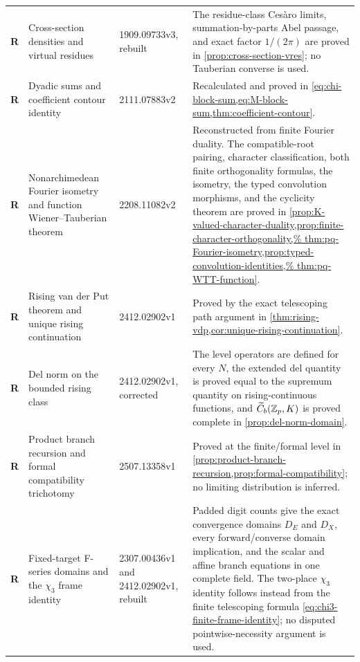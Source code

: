 \begin{longtable}{@{}p{}p{}p{}p{}@{}}
\textbf{R} & Cross-section densities and virtual residues & 1909.09733v3,
rebuilt & The residue-class Ces\`aro limits, summation-by-parts Abel passage,
and exact factor $1/(2\pi)$ are proved in
\cref{prop:cross-section-vres}; no Tauberian converse is used.\\

\textbf{R} & Dyadic sums and coefficient contour identity &
2111.07883v2 & Recalculated and proved in
\cref{eq:chi-block-sum,eq:M-block-sum,thm:coefficient-contour}.\\

\textbf{R} & Nonarchimedean Fourier isometry and function
Wiener--Tauberian theorem & 2208.11082v2 & Reconstructed from finite Fourier
duality.  The compatible-root pairing, character classification, both finite
orthogonality formulas, the isometry, the typed convolution morphisms, and
the cyclicity theorem are proved in
\cref{prop:K-valued-character-duality,prop:finite-character-orthogonality,%
thm:pq-Fourier-isometry,prop:typed-convolution-identities,%
thm:pq-WTT-function}.\\

\textbf{R} & Rising van der Put theorem and unique rising continuation &
2412.02902v1 & Proved by the exact telescoping path argument in
\cref{thm:rising-vdp,cor:unique-rising-continuation}.\\

\textbf{R} & Del norm on the bounded rising class & 2412.02902v1, corrected &
The level operators are defined for every $N$, the extended del quantity is
proved equal to the supremum quantity on rising-continuous functions, and
$\widetilde C_b(\mathbb Z_p,K)$ is proved complete in
\cref{prop:del-norm-domain}.\\

\textbf{R} & Product branch recursion and formal compatibility trichotomy &
2507.13358v1 & Proved at the finite/formal level in
\cref{prop:product-branch-recursion,prop:formal-compatibility}; no limiting
distribution is inferred.\\

\textbf{R} & Fixed-target F-series domains and the $\chi_3$ frame identity &
2307.00436v1 and 2412.02902v1, rebuilt & Padded digit counts give the exact
convergence domains $D_E$ and $D_X$, every forward/converse domain
implication, and the scalar and affine branch equations in one complete
field.  The two-place $\chi_3$ identity follows instead from the finite
telescoping formula \cref{eq:chi3-finite-frame-identity}; no disputed
pointwise-necessity argument is used.\\


\end{longtable}
